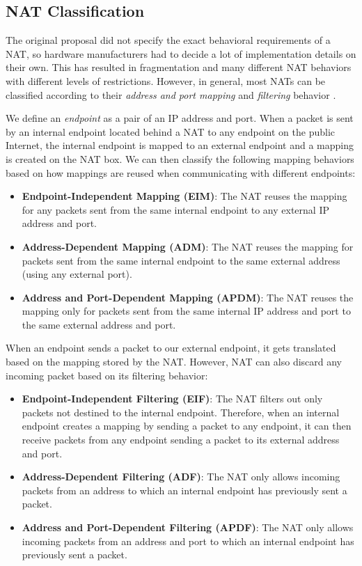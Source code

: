 \subsection{NAT Classification}
\label{nat-classification}


The original proposal did not specify the exact behavioral requirements of a NAT, so hardware manufacturers had to decide a lot of implementation details on their own. This has resulted in fragmentation and many different NAT behaviors with different levels of restrictions. However, in general, most NATs can be classified according to their \textit{address and port mapping} and \textit{filtering} behavior \cite{behave}.

We define an \textit{endpoint} as a pair of an IP address and port. When a packet is sent by an internal endpoint located behind a NAT to any endpoint on the public Internet, the internal endpoint is mapped to an external endpoint and a mapping is created on the NAT box. We can then classify the following mapping behaviors based on how mappings are reused when communicating with different endpoints:

\begin{itemize}
    \item \textbf{Endpoint-Independent Mapping (EIM)}: The NAT reuses the mapping for any packets sent from the same internal endpoint to any external IP address and port.
    \item \textbf{Address-Dependent Mapping (ADM)}: The NAT reuses the mapping for packets sent from the same internal endpoint to the same external address (using any external port).
    \item \textbf{Address and Port-Dependent Mapping (APDM)}: The NAT reuses the mapping only for packets sent from the same internal IP address and port to the same external address and port.
\end{itemize}


When an endpoint sends a packet to our external endpoint, it gets translated based on the mapping stored by the NAT. However, NAT can also discard any incoming packet based on its filtering behavior:

\begin{itemize}
    \item \textbf{Endpoint-Independent Filtering (EIF)}: The NAT filters out only packets not destined to the internal endpoint. Therefore, when an internal endpoint creates a mapping by sending a packet to any endpoint, it can then receive packets from any endpoint sending a packet to its external address and port.
    \item \textbf{Address-Dependent Filtering (ADF)}: The NAT only allows incoming packets from an address to which an internal endpoint has previously sent a packet.
    \item \textbf{Address and Port-Dependent Filtering (APDF)}: The NAT only allows incoming packets from an address and port to which an internal endpoint has previously sent a packet.
\end{itemize}

